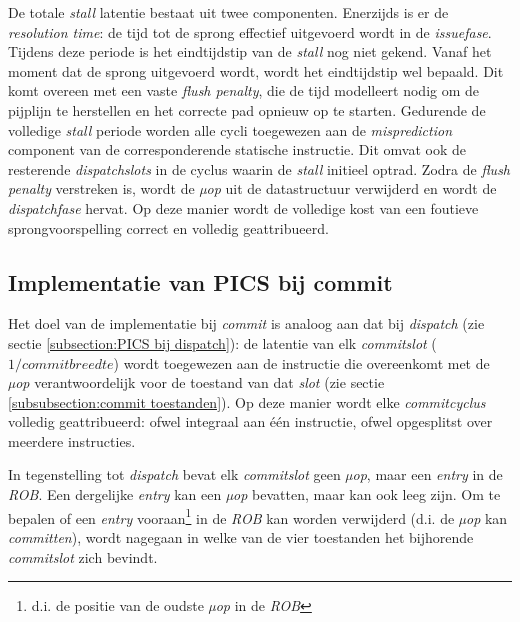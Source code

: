 \documentclass[12pt,a4paper,faculty=ea,language=nl]{ugent-doc}
\begin{document}
\begin{enumerate}
De totale \textit{stall} latentie bestaat uit twee componenten. Enerzijds is er de \textit{resolution time}: de tijd tot de sprong effectief uitgevoerd wordt in de \textit{issuefase}. Tijdens deze periode is het eindtijdstip van de \textit{stall} nog niet gekend.
Vanaf het moment dat de sprong uitgevoerd wordt, wordt het eindtijdstip wel bepaald. Dit komt overeen met een vaste \textit{flush penalty}, die de tijd modelleert nodig om de pijplijn te herstellen en het correcte pad opnieuw op te starten.
Gedurende de volledige \textit{stall} periode worden alle cycli toegewezen aan de \textit{misprediction} component van de corresponderende statische instructie. Dit omvat ook de resterende \textit{dispatchslots} in de cyclus waarin de \textit{stall} initieel optrad.
Zodra de \textit{flush penalty} verstreken is, wordt de \textit{µop} uit de datastructuur verwijderd en wordt de \textit{dispatchfase} hervat.
Op deze manier wordt de volledige kost van een foutieve sprongvoorspelling correct en volledig geattribueerd.
\end{enumerate}

\subsection{Implementatie van PICS bij commit}

Het doel van de implementatie bij \textit{commit} is analoog aan dat bij \textit{dispatch} (zie sectie \ref{subsection:PICS bij dispatch}): de latentie van elk \textit{commitslot} (\(1 / \textit{commitbreedte}\)) wordt toegewezen aan de instructie die overeenkomt met de \textit{µop} verantwoordelijk voor de toestand van dat \textit{slot} (zie sectie \ref{subsubsection:commit toestanden}).
Op deze manier wordt elke \textit{commitcyclus} volledig geattribueerd: ofwel integraal aan één instructie, ofwel opgesplitst over meerdere instructies.

In tegenstelling tot \textit{dispatch} bevat elk \textit{commitslot} geen \textit{µop}, maar een \textit{entry} in de \textit{ROB}. Een dergelijke \textit{entry} kan een \textit{µop} bevatten, maar kan ook leeg zijn.
Om te bepalen of een \textit{entry} vooraan\footnote{d.i. de positie van de oudste \textit{µop} in de \textit{ROB}} in de \textit{ROB} kan worden verwijderd (d.i. de \textit{µop} kan \textit{committen}), wordt nagegaan in welke van de vier toestanden het bijhorende \textit{commitslot} zich bevindt.
\end{document}
